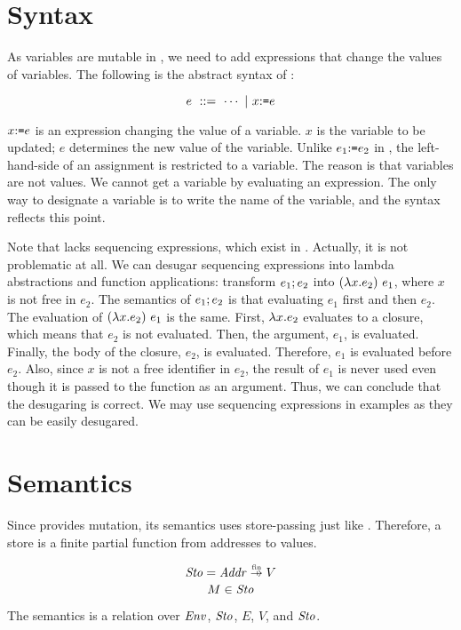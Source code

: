\section{Syntax}

As variables are mutable in \lang, we need to add expressions that change the
values of variables. The following is the abstract syntax of \lang:

\[ e\ ::=\ \cdots\ |\ \eset{x}{e} \]

$x{:}\texttt{=} e$ is an expression changing the value of a variable. $x$ is the
variable to be updated; $e$ determines the new value of the variable. Unlike
$e_1{:}\texttt{=} e_2$ in \bfae, the left-hand-side of an assignment is restricted to
a variable. The reason is that variables are not values. We cannot get a
variable by evaluating an expression. The only way to designate a variable is
to write the name of the variable, and the syntax reflects this point.

Note that \lang lacks sequencing expressions, which exist in \bfae. Actually, it
is not problematic at all. We can desugar sequencing expressions into
lambda abstractions and function applications: transform $e_1;e_2$ into
$(\lambda x.e_2)\ e_1$, where $x$ is not free in $e_2$. The semantics of
$e_1;e_2$ is that evaluating $e_1$ first and then $e_2$. The evaluation
of $(\lambda x.e_2)\ e_1$ is the same. First, $\lambda x.e_2$ evaluates
to a closure, which means that $e_2$ is not evaluated. Then, the argument,
$e_1$, is evaluated. Finally, the body of the closure, $e_2$, is evaluated. Therefore,
$e_1$ is evaluated before $e_2$. Also, since $x$ is not a free identifier in
$e_2$, the result of $e_1$ is never used even though it is passed to the
function as an argument. Thus, we can conclude that the desugaring is correct.
We may use sequencing expressions in examples as they can be easily desugared.

\section{Semantics}

Since \lang provides mutation, its semantics uses store-passing just like \bfae.
Therefore, a store is a finite partial function from addresses to values.

\[ \embox{Sto} = \embox{Addr}\finto V \]
\[ M \in \mbox{\emph{Sto}} \]

The semantics is a
relation over $\mbox{\emph{Env}}$, $\mbox{\emph{Sto}}$, $E$, $V$, and $\mbox{\emph{Sto}}$.

